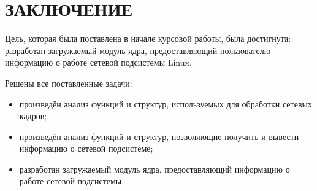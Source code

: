 \chapter*{ЗАКЛЮЧЕНИЕ}

Цель, которая была поставлена в начале курсовой работы, была достигнута: разработан загружаемый модуль ядра, предоставляющий пользователю информацию о работе сетевой подсистемы Linux.

Решены все поставленные задачи:
\begin{itemize}[label=---]
	\item произведён анализ функций и структур, используемых для обработки сетевых кадров;
	\item произведён анализ функций и структур, позволяющие получить и вывести информацию о сетевой подсистеме;
	\item разработан загружаемый модуль ядра, предоставляющий информацию о работе сетевой подсистемы.
\end{itemize}